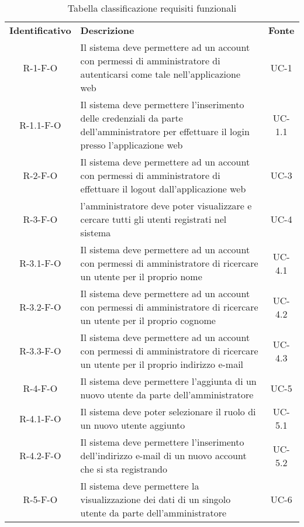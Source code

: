 \renewcommand{\arraystretch}{1.5}
\begin{longtable}{ c C{9.5cm} c }
    \caption{Tabella classificazione requisiti funzionali}\\
    \rowcolor{\primaryColor}
    \textcolor{\secondaryColor}{
    \textbf{Identificativo}} & \textcolor{\secondaryColor}{\textbf{Descrizione}}                                                            & \textcolor{\secondaryColor}
    {\textbf{Fonte}}                                                                                                                                                      \\


    R-1-F-O & Il sistema deve permettere ad un account con permessi di amministratore di autenticarsi come tale nell'applicazione web& UC-1 \\
    R-1.1-F-O & Il sistema deve permettere l'inserimento delle credenziali da parte dell'amministratore per effettuare il login presso l'applicazione web& UC-1.1 \\
    R-2-F-O & Il sistema deve permettere ad un account con permessi di amministratore di effettuare il logout dall'applicazione web& UC-3 \\
    R-3-F-O & l'amministratore deve poter visualizzare e cercare tutti gli utenti registrati nel sistema& UC-4 \\
    R-3.1-F-O & Il sistema deve permettere ad un account con permessi di amministratore di ricercare un utente per il proprio nome& UC-4.1 \\
    R-3.2-F-O & Il sistema deve permettere ad un account con permessi di amministratore di ricercare un utente per il proprio cognome& UC-4.2 \\
    R-3.3-F-O & Il sistema deve permettere ad un account con permessi di amministratore di ricercare un utente per il proprio indirizzo e-mail& UC-4.3 \\
    R-4-F-O & Il sistema deve permettere l'aggiunta di un nuovo utente da parte dell'amministratore& UC-5 \\
    R-4.1-F-O & Il sistema deve poter selezionare il ruolo di un nuovo utente aggiunto& UC-5.1 \\
    R-4.2-F-O & Il sistema deve permettere l'inserimento dell'indirizzo e-mail di un nuovo account che si sta registrando& UC-5.2 \\
    R-5-F-O & Il sistema deve permettere la visualizzazione dei dati di un singolo utente da parte dell'amministratore& UC-6 \\

\end{longtable}
